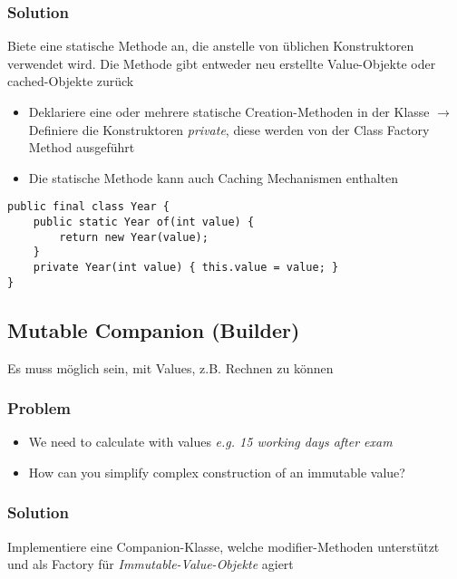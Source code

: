 \subsubsection{Solution}

Biete eine statische Methode an, die anstelle von üblichen Konstruktoren verwendet wird. Die Methode gibt entweder neu erstellte Value-Objekte oder cached-Objekte zurück

\begin{itemize}
    \item Deklariere eine oder mehrere statische Creation-Methoden in der Klasse $\rightarrow$ Definiere die Konstruktoren \textit{private}, diese werden von der Class Factory Method ausgeführt
    \item Die statische Methode kann auch Caching Mechanismen enthalten
\end{itemize}
\begin{lstlisting}
public final class Year {
    public static Year of(int value) {
        return new Year(value);
    }
    private Year(int value) { this.value = value; }
}
\end{lstlisting}

\subsection{Mutable Companion (Builder)}

Es muss möglich sein, mit Values, z.B. Rechnen zu können

\subsubsection{Problem}
\begin{itemize}
    \item We need to calculate with values \textit{e.g. 15 working days after exam}
    \item How can you simplify complex construction of an immutable value?
\end{itemize}

\subsubsection{Solution}

Implementiere eine Companion-Klasse, welche modifier-Methoden unterstützt und als Factory für \textit{Immutable-Value-Objekte} agiert

